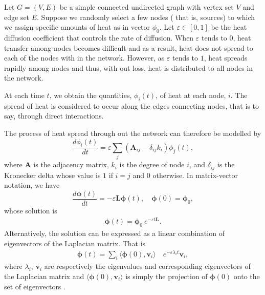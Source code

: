\documentclass[10pt,a4paper]{article}
\begin{document}
    Let $G=(V,E)$ be a simple connected undirected graph with vertex set $V$ and edge set $E$. Suppose we randomly select a few nodes ( that is, sources) to which we assign specific amounts of heat as in vector $\phi_0$. Let $\varepsilon \in [0,1]$ be the heat diffusion coefficient that controls the rate of diffusion. When $\varepsilon$ tends to $0$, heat transfer among nodes becomes difficult and as a result, heat does not spread to each of the nodes with in the network. However, as $\varepsilon$ tends to $1$, heat spreads rapidly among nodes and thus, with out loss, heat is distributed to all nodes in the network.
    
   At each time $t$, we obtain the quantities, $\phi_i(t)$, of heat at each node, $i$. The spread of heat is considered to occur along the edges connecting nodes, that is to say, through direct interactions.  
    	
    	The process of heat spread through out the network can therefore be modelled by
    	\begin{equation}
    	\frac{d\phi_i(t)}{dt} = \varepsilon \sum_j (\mathbf{A}_{ij} - \delta_{ij} k_i) \phi_j(t),
    	\label{difusion}
    	\end{equation}
    	where $\mathbf{A}$ is the adjacency matrix, $k_i$ is the degree of node $i$, and $\delta_{ij}$ is the Kronecker delta whose value is $1$ if $i=j$ and $0$ otherwise. In matrix-vector notation, we have
    	\begin{equation}
    	\frac{d\boldsymbol{\phi}(t)}{dt} = -\varepsilon\mathbf{L}\boldsymbol{\phi}(t), \quad \boldsymbol{\phi}(0) = \boldsymbol{\phi}_0 ,
    	\label{dif-final-eqn}
    	\end{equation}
    	whose solution is 
    	\begin{eqnarray}
    	\boldsymbol{\phi}(t) = \boldsymbol{\phi}_0~e^{-\varepsilon t \mathbf{L}}.
    	\end{eqnarray}
    	Alternatively, the solution can be expressed as a linear combination of eigenvectors of the Laplacian matrix. That is
    	 \begin{eqnarray*}
    	 	\boldsymbol{\phi}(t) = \sum_i \langle \boldsymbol{\phi}(0),\mathbf{v}_i \rangle \quad e^{-\varepsilon\lambda_i t} \mathbf{v}_i,  
    	 \end{eqnarray*}
    	 where $\lambda_i$, $\mathbf{v}_i$ are respectively the eigenvalues and corresponding eigenvectors of the Laplacian matrix and $\langle \boldsymbol{\phi}(0),\mathbf{v}_i \rangle$ is simply the projection of $\boldsymbol{\phi}(0)$ onto the set of eigenvectors \citep{anton2007elementary}.
    	 
\end{document}
